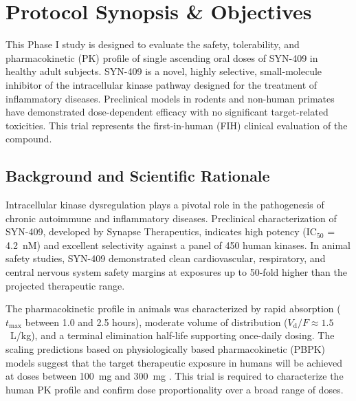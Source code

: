 \section{Protocol Synopsis \& Objectives}
\label{sec:introduction}

\begin{tcolorbox}[
  colback=lightbg,
  colframe=secondary,
  arc=3pt,
  boxrule=1pt,
  left=10pt,
  right=10pt,
  top=8pt,
  bottom=8pt,
  title=\textbf{Protocol Abstract \& Study Rationale},
  coltitle=white,
  fonttitle=\bfseries
]
  This Phase I study is designed to evaluate the safety, tolerability, and pharmacokinetic (PK) profile of single ascending oral doses of SYN-409 in healthy adult subjects. SYN-409 is a novel, highly selective, small-molecule inhibitor of the intracellular kinase pathway designed for the treatment of inflammatory diseases. Preclinical models in rodents and non-human primates have demonstrated dose-dependent efficacy with no significant target-related toxicities. This trial represents the first-in-human (FIH) clinical evaluation of the compound.
\end{tcolorbox}

\subsection{Background and Scientific Rationale}

Intracellular kinase dysregulation plays a pivotal role in the pathogenesis of chronic autoimmune and inflammatory diseases. Preclinical characterization of SYN-409, developed by Synapse Therapeutics, indicates high potency (IC$_{50}$ = 4.2~nM) and excellent selectivity against a panel of 450 human kinases. In animal safety studies, SYN-409 demonstrated clean cardiovascular, respiratory, and central nervous system safety margins at exposures up to 50-fold higher than the projected therapeutic range.

The pharmacokinetic profile in animals was characterized by rapid absorption ($t_{\max}$ between 1.0 and 2.5 hours), moderate volume of distribution ($V_{\text{d}}/F \approx 1.5$~L/kg), and a terminal elimination half-life supporting once-daily dosing. The scaling predictions based on physiologically based pharmacokinetic (PBPK) models suggest that the target therapeutic exposure in humans will be achieved at doses between 100~mg and 300~mg \citep{sterling2025scaling}. This trial is required to characterize the human PK profile and confirm dose proportionality over a broad range of doses.

